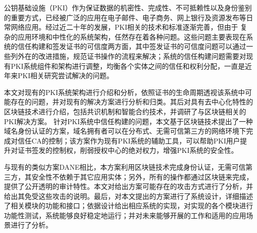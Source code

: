 
\begin{cabstract}





公钥基础设施（PKI）作为保证数据的机密性、完成性、不可抵赖性以及身份鉴别的重要方式，已经被广泛的应用在电子邮件、电子商务、网上银行及资源发布等日常网络应用。经过近二十年的发展，PKI相关的技术和标准逐渐完善，但由于%
复杂的应用环境和中性化的系统架构，任然存在着各种问题。这些问题主要表现在系统的信任构建和签发证书的可信度两方面，其中签发证书的可信度问题可以通过一些列外在的改进措施，规范证书操作的流程来解决；系统的信任构建问题需要对现有PKI系统组件和架构进行调整，均衡各个实体之间的信任和权利分配，一直是近年来PKI相关研究尝试解决的问题。


本文对现有的PKI系统架构进行介绍和分析，依照证书的生命周期透视该系统中可能存在的问题，并对现有的解决方案进行分析和归类。其后对具有去中心化特性的区块链技术进行介绍，包括共识机制和智能合约技术，并调研了与区块链相关的PKI解决方案。
针对PKI系统中信任构建的问题，本文基于区块链技术提出了一种域名身份认证的方案，域名拥有者可以在分布式、无需可信第三方的网络环境下完成对信任CA的控制；该方案作为现有PKI系统的辅助工具，可以帮助PKI用户提升对证书签发的控制权，削弱授权中心的绝对权力，增强PKI系统的安全性。

与现有的类似方案DANE相比，本方案利用区块链技术完成身份认证，无需可信第三方，其安全性不依赖于其它应用实体；另外，所有的操作都通过区块链来完成，提供了公开透明的审计特性。本文对给出方案可能存在的攻击方式进行了分析，并给出其免受这些攻击的说明。最后，对本文提出的方案进行了系统设计，详细描述了相关模块的功能和接口；依据设计给出相应系统的实现，对实现的各个模块进行功能性测试，系统能够良好稳定地运行；并对未来能够开展的工作和适用的应用场景进行了分析。


\end{cabstract}
